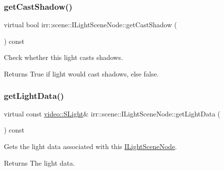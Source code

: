 \subsubsection{\texorpdfstring{get\+Cast\+Shadow()}{getCastShadow()}}
{\footnotesize\ttfamily virtual bool irr\+::scene\+::\+I\+Light\+Scene\+Node\+::get\+Cast\+Shadow (\begin{DoxyParamCaption}{ }\end{DoxyParamCaption}) const\hspace{0.3cm}{\ttfamily [pure virtual]}}



Check whether this light casts shadows. 

\begin{DoxyReturn}{Returns}
True if light would cast shadows, else false. 
\end{DoxyReturn}
\mbox{\label{classirr_1_1scene_1_1ILightSceneNode_a687813feae9312a86882e12c2bd10194}} 
\subsubsection{\texorpdfstring{get\+Light\+Data()}{getLightData()}\hspace{0.1cm}{\footnotesize\ttfamily [1/2]}}
{\footnotesize\ttfamily virtual const \hyperlink{structirr_1_1video_1_1SLight}{video\+::\+S\+Light}\& irr\+::scene\+::\+I\+Light\+Scene\+Node\+::get\+Light\+Data (\begin{DoxyParamCaption}{ }\end{DoxyParamCaption}) const\hspace{0.3cm}{\ttfamily [pure virtual]}}



Gets the light data associated with this \hyperlink{classirr_1_1scene_1_1ILightSceneNode}{I\+Light\+Scene\+Node}. 

\begin{DoxyReturn}{Returns}
The light data. 
\end{DoxyReturn}
\mbox{\label{classirr_1_1scene_1_1ILightSceneNode_a20147e049be1a4790346fd72b150b30c}} 
